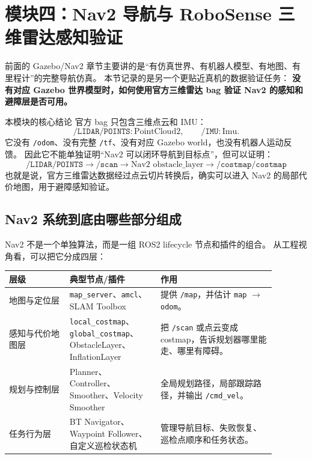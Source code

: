 \documentclass[UTF8,11pt,a4paper]{ctexart}
\begin{document}
\section{模块四：Nav2 导航与 RoboSense 三维雷达感知验证}

前面的 Gazebo/Nav2 章节主要讲的是“有仿真世界、有机器人模型、有地图、有里程计”的完整导航仿真。
本节记录的是另一个更贴近真机的数据验证任务：
\textbf{没有对应 Gazebo 世界模型时，如何使用官方三维雷达 bag 验证 Nav2 的感知和避障层是否可用。}

\begin{orangebox}{本模块的核心结论}
官方 bag 只包含三维点云和 IMU：
\[
\texttt{/LIDAR/POINTS}:\text{PointCloud2},\qquad
\texttt{/IMU}:\text{Imu}.
\]
它没有 \texttt{/odom}、没有完整 \texttt{/tf}、没有对应 Gazebo world，也没有机器人运动反馈。
因此它不能单独证明“Nav2 可以闭环导航到目标点”，但可以证明：
\[
\boxed{
\texttt{/LIDAR/POINTS}
\rightarrow
\texttt{/scan}
\rightarrow
\text{Nav2 obstacle\_layer}
\rightarrow
\texttt{/costmap/costmap}
}
\]
也就是说，官方三维雷达数据经过点云切片转换后，确实可以进入 Nav2 的局部代价地图，用于避障感知验证。
\end{orangebox}

\subsection{Nav2 系统到底由哪些部分组成}

Nav2 不是一个单独算法，而是一组 ROS2 lifecycle 节点和插件的组合。
从工程视角看，可以把它分成四层：

\begin{center}
\renewcommand{\arraystretch}{1.25}
\begin{tabular}{p{0.20\linewidth}p{0.30\linewidth}p{0.38\linewidth}}
\toprule
\textbf{层级} & \textbf{典型节点/插件} & \textbf{作用}\\
\midrule
地图与定位层 &
\texttt{map\_server}、\texttt{amcl}、SLAM Toolbox &
提供 \texttt{/map}，并估计 \texttt{map} \(\rightarrow\) \texttt{odom}。\\
感知与代价地图层 &
\texttt{local\_costmap}、\texttt{global\_costmap}、ObstacleLayer、InflationLayer &
把 \texttt{/scan} 或点云变成 costmap，告诉规划器哪里能走、哪里有障碍。\\
规划与控制层 &
Planner、Controller、Smoother、Velocity Smoother &
全局规划路径，局部跟踪路径，并输出 \texttt{/cmd\_vel}。\\
任务行为层 &
BT Navigator、Waypoint Follower、自定义巡检状态机 &
管理导航目标、失败恢复、巡检点顺序和任务状态。\\
\bottomrule
\end{tabular}
\end{center}
\end{document}
